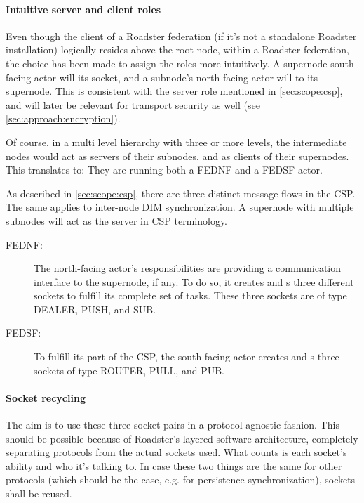 \paragraph{Intuitive server and client roles}
Even though the client of a Roadster federation (if it's not a standalone
Roadster installation) logically resides above the root node, within a Roadster
federation, the choice has been made to assign the roles more intuitively. A
supernode south-facing actor will  its socket, and a subnode's
north-facing actor will  to its supernode. This is consistent
with the server role mentioned in \autoref{sec:scope:csp}, and will later be
relevant for transport security as well (see \autoref{sec:approach:encryption}).

Of course, in a multi level hierarchy with three or more levels, the
intermediate nodes would act as servers of their subnodes, and as clients of
their supernodes. This translates to: They are running both a FEDNF and a FEDSF
actor.

As described in \autoref{sec:scope:csp}, there are three distinct message flows
in the \gls{CSP}. The same applies to inter-node DIM synchronization. A
supernode with multiple subnodes will act as the server in CSP terminology.

\begin{description}
	\item [FEDNF:]
		The north-facing actor's responsibilities are providing a
		communication interface to the supernode, if any. To do so, it
		creates and s three different sockets to fulfill
		its complete set of tasks. These three sockets are of type
		DEALER, PUSH, and SUB.

	\item [FEDSF:]
		To fulfill its part of the CSP, the south-facing actor creates
		and s three sockets of type ROUTER, PULL, and PUB.
\end{description}

\paragraph{Socket recycling}
The aim is to use these three socket pairs in a protocol agnostic fashion. This
should be possible because of Roadster's layered software architecture,
completely separating protocols from the actual sockets used. What counts is
each socket's ability and who it's talking to. In case these two things are the
same for other protocols (which should be the case, e.g. for persistence
synchronization), sockets shall be reused.

